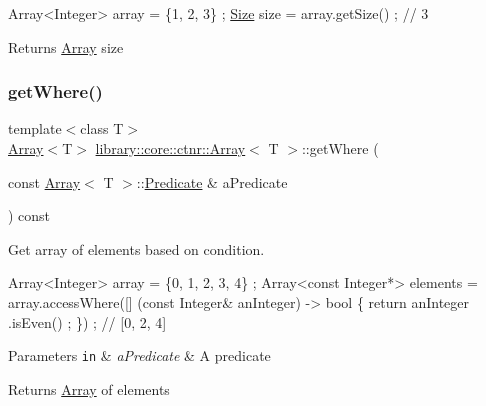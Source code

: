 \begin{DoxyCode}
Array<Integer> array = \{1, 2, 3\} ;
\hyperlink{namespacelibrary_1_1core_1_1types_a701626ea1027888ebbb8cfd0ff7adab0}{Size} size = array.getSize() ; \textcolor{comment}{// 3}
\end{DoxyCode}


\begin{DoxyReturn}{Returns}
\hyperlink{classlibrary_1_1core_1_1ctnr_1_1_array}{Array} size 
\end{DoxyReturn}
\mbox{\label{classlibrary_1_1core_1_1ctnr_1_1_array_a62069b24d593b2265422cb8f3a149c44}} 
\subsubsection{\texorpdfstring{get\+Where()}{getWhere()}}
{\footnotesize\ttfamily template$<$class T$>$ \\
\hyperlink{classlibrary_1_1core_1_1ctnr_1_1_array}{Array}$<$T$>$ \hyperlink{classlibrary_1_1core_1_1ctnr_1_1_array}{library\+::core\+::ctnr\+::\+Array}$<$ T $>$\+::get\+Where (\begin{DoxyParamCaption}\item[{const \hyperlink{classlibrary_1_1core_1_1ctnr_1_1_array}{Array}$<$ T $>$\+::\hyperlink{classlibrary_1_1core_1_1ctnr_1_1_array_a74cd325a740870aea490b6b739aa06ae}{Predicate} \&}]{a\+Predicate }\end{DoxyParamCaption}) const}



Get array of elements based on condition. 


\begin{DoxyCode}
Array<Integer> array = \{0, 1, 2, 3, 4\} ;
Array<const Integer*> elements = array.accessWhere([] (\textcolor{keyword}{const} Integer& anInteger) -> \textcolor{keywordtype}{bool} \{ \textcolor{keywordflow}{return} anInteger
      .isEven() ; \}) ; \textcolor{comment}{// [0, 2, 4]}
\end{DoxyCode}



\begin{DoxyParams}[1]{Parameters}
\mbox{\tt in}  & {\em a\+Predicate} & A predicate \\
\hline
\end{DoxyParams}
\begin{DoxyReturn}{Returns}
\hyperlink{classlibrary_1_1core_1_1ctnr_1_1_array}{Array} of elements 
\end{DoxyReturn}
\mbox{\label{classlibrary_1_1core_1_1ctnr_1_1_array_a77d943be46a6d0313be3f2c5ca66d231}} 
